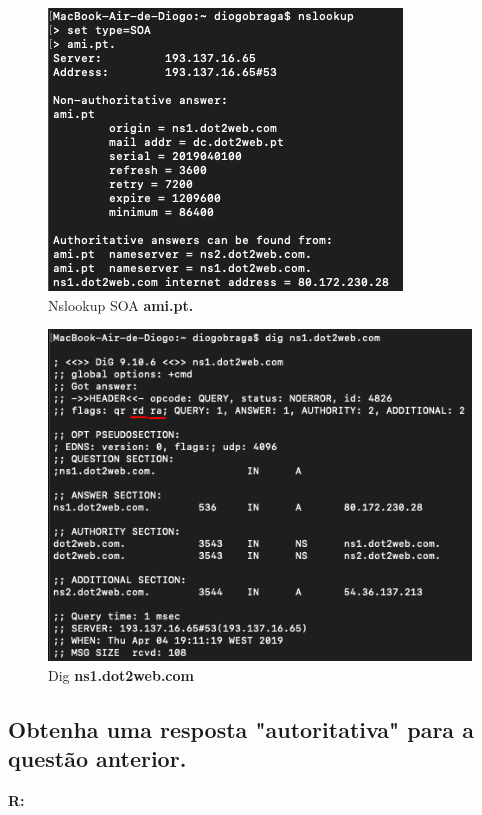 \documentclass{llncs}
\begin{document}
\begin{figure}[H]
\begin{center}
\includegraphics[scale=0.6]{5.png}
\end{center}
\caption{\label{fig:5}Nslookup SOA \textbf{ami.pt.}}
\end{figure}

\begin{figure}[H]
\begin{center}
\includegraphics[scale=0.6]{5_2.png}
\end{center}
\caption{\label{fig:52}Dig \textbf{ns1.dot2web.com}}
\end{figure}


\subsection{\textbf{Obtenha uma resposta "autoritativa" para a questão anterior.}}
\textbf{R:}
\end{document}
